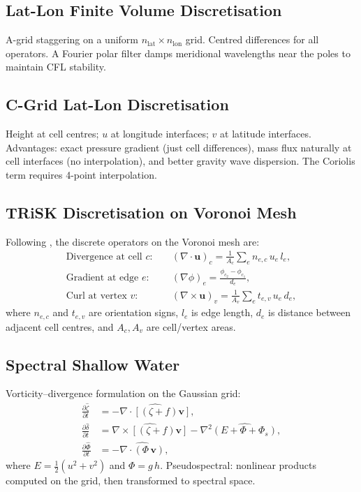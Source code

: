 \documentclass[11pt,twoside]{report}
\newcommand{\pp}{\partial}
\newcommand{\half}{\tfrac{1}{2}}
\newcommand{\vect}[1]{\bm{#1}}
\newcommand{\grad}{\nabla}
\newcommand{\divg}{\nabla\!\cdot\!}
\newcommand{\curl}{\nabla\!\times\!}
\begin{document}
\subsection{Lat-Lon Finite Volume Discretisation}

A-grid staggering on a uniform $n_{\mathrm{lat}}\times n_{\mathrm{lon}}$
grid.  Centred differences for all operators.  A Fourier polar filter
damps meridional wavelengths near the poles to maintain CFL stability.

\subsection{C-Grid Lat-Lon Discretisation}

Height at cell centres; $u$ at longitude interfaces; $v$ at latitude
interfaces.  Advantages: exact pressure gradient (just cell differences),
mass flux naturally at cell interfaces (no interpolation), and better
gravity wave dispersion.  The Coriolis term requires 4-point interpolation.

\subsection{TRiSK Discretisation on Voronoi Mesh}

Following \citet{Ringler2010}, the discrete operators on the Voronoi
mesh are:
\begin{align}
  \text{Divergence at cell } c: &\quad
    (\divg\vect{u})_c = \frac{1}{A_c}\sum_e n_{e,c}\,u_e\,l_e, \\
  \text{Gradient at edge } e: &\quad
    (\grad\phi)_e = \frac{\phi_{c_2}-\phi_{c_1}}{d_e}, \\
  \text{Curl at vertex } v: &\quad
    (\curl\vect{u})_v = \frac{1}{A_v}\sum_e t_{e,v}\,u_e\,d_e,
\end{align}
where $n_{e,c}$ and $t_{e,v}$ are orientation signs, $l_e$ is edge length,
$d_e$ is distance between adjacent cell centres, and $A_c,A_v$ are
cell/vertex areas.

\subsection{Spectral Shallow Water}

Vorticity--divergence formulation on the Gaussian grid:
\begin{align}
  \frac{\pp\hat\zeta}{\pp t} &= -\widehat{\divg[(\zeta+f)\vect{v}]}, \\
  \frac{\pp\hat\delta}{\pp t} &= \widehat{\curl[(\zeta+f)\vect{v}]}
    - \nabla^2\widehat{(E+\Phi+\Phi_s)}, \\
  \frac{\pp\hat\Phi}{\pp t} &= -\widehat{\divg(\Phi\,\vect{v})},
\end{align}
where $E=\half(u^2+v^2)$ and $\Phi=g\,h$.  Pseudospectral: nonlinear
products computed on the grid, then transformed to spectral space.
\end{document}
